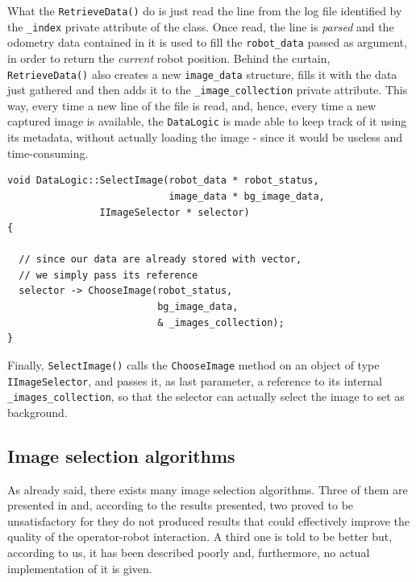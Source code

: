 %
What the \texttt{RetrieveData()} do is just read the line from the log 
file identified by the \texttt{\_index} private attribute of the class.
Once read, the line is \textit{parsed} and the odometry data contained 
in it is used to fill the \texttt{robot\_data} passed as argument, in 
order to return the \textit{current} robot position.
%
Behind the curtain, \texttt{RetrieveData()} also creates a new 
\texttt{image\_data} structure, fills it with the data just 
gathered and then adds it to the \texttt{\_image\_collection} 
private attribute.
%
This way, every time a new line of the file is read, and, hence, 
every time a new captured image is available, the \texttt{DataLogic} 
is made able to keep track of it using its metadata, without actually 
loading the image - since it would be useless and time-consuming.
%
\begin{lstlisting}[caption={\texttt{DataLogic::SelectImage()} method}, label={code:selectimage_method}, frame=trBL]
void DataLogic::SelectImage(robot_data * robot_status,
                            image_data * bg_image_data,
			    IImageSelector * selector)
{

  // since our data are already stored with vector,
  // we simply pass its reference
  selector -> ChooseImage(robot_status, 
                          bg_image_data, 
                          & _images_collection);
}
\end{lstlisting}
%
Finally, \texttt{SelectImage()} calls the \texttt{ChooseImage} method 
on an object of type \texttt{IImageSelector}, and passes it, as last 
parameter, a reference to its internal \texttt{\_images\_collection}, 
so that the selector can actually select the image to set as 
background.
%
%
%
\subsection{Image selection algorithms}
\label{sub:metrics}
As already said, there exists many image selection algorithms. 
Three of them are presented in \cite{sugimoto} and, according 
to the results presented, two proved to be unsatisfactory for 
they do not produced results that could effectively improve 
the quality of the operator-robot interaction.
%
A third one is told to be better but, according to us, it has 
been described poorly and, furthermore, no actual implementation 
of it is given.
%

